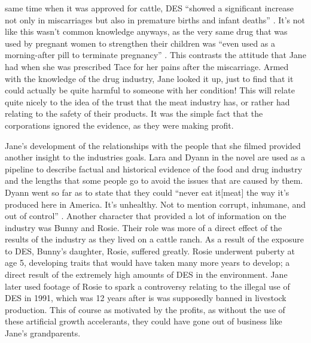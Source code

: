 \documentclass{article}
\begin{document}
same time when it was approved for cattle, DES ``showed a significant
increase not only in miscarriages but also in premature births and infant
deaths'' \cite[Ch. 6]{ozeki1998my}. It's not like this wasn't common
knowledge anyways, as the very same drug that was used by pregnant women to
strengthen their children was ``even used as a morning-after pill to
terminate pregnancy'' \cite[Ch. 6]{ozeki1998my}. This contrasts the attitude
that Jane had when she was prescribed Tace for her pains after the
miscarriage. Armed with the knowledge of the drug industry, Jane looked it
up, just to find that it could actually be quite harmful to someone with her
condition! This will relate quite nicely to the idea of the trust that the
meat industry has, or rather had relating to the safety of their products.
It was the simple fact that the corporations ignored the evidence, as they
were making profit.

Jane's development of the relationships with the people that she filmed
provided another insight to the industries goals. Lara and Dyann in the
novel are used as a pipeline to describe factual and historical evidence of
the food and drug industry and the lengths that some people go to avoid the
issues that are caused by them. Dyann went so far as to state that they
could ``never eat it[meat] the way it’s produced here in America. It’s
unhealthy. Not to mention corrupt, inhumane, and out of control''
\cite[Ch. 8]{ozeki1998my}. Another character that provided a lot of
information on the industry was Bunny and Rosie. Their role was more of a
direct effect of the results of the industry as they lived on a cattle
ranch. As a result of the exposure to DES, Bunny's daughter, Rosie, suffered
greatly. Rosie underwent puberty at age 5, developing traits that would have
taken many more years to develop; a direct result of the extremely high
amounts of DES in the environment. Jane later used footage of Rosie to spark
a controversy relating to the illegal use of DES in 1991, which was 12 years
after is was supposedly banned in livestock production. This of course as
motivated by the profits, as without the use of these artificial growth
accelerants, they could have gone out of business like Jane's grandparents.

%
\end{document}
